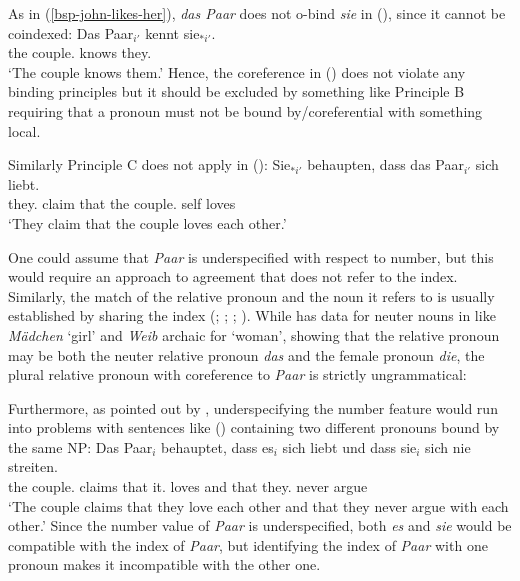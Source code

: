 \documentclass[output=paper
	        ,collection
	        ,collectionchapter
 	        ,biblatex
                ,babelshorthands
                ,newtxmath
                ,draftmode
                ,colorlinks, citecolor=brown
]{langscibook}
\begin{document}
As in (\ref{bsp-john-likes-her}), \emph{das Paar} does not o-bind \emph{sie} in (), since it cannot be coindexed:
\ea
\gll Das Paar$_{i'}$ kennt sie$_{*i'}$.\\
     the couple.\sg{} knows they.\pl\\
\glt `The couple knows them.'
\z
Hence, the coreference in () does not violate any binding principles but it should be excluded
by something like Principle B requiring that a pronoun must not be bound by/coreferential with
something local.

Similarly Principle C does not apply in ():
\ea
\gll Sie$_{*i'}$ behaupten, dass das Paar$_{i'}$ sich liebt.\\
     they.\pl{} claim      that the couple.\sg{} self loves\\
\glt `They claim that the couple loves each other.'
\z

One could assume that \emph{Paar} is underspecified with respect to number, but this would require
an approach to agreement that does not refer to the index.
\eal
{}
\zl
Similarly, the match of the relative pronoun and the noun it refers to is usually established by
sharing the index (\citealp[Chapter~5]{ps2}; \citealp{Sag97a}; \citealp[Chapter~11]{MuellerLehrbuch1};
). While \citet[--418]{Mueller99a} has data for neuter nouns in 
like \emph{Mädchen} `girl' and \emph{Weib} archaic for `woman', showing that the relative pronoun may be both the neuter
relative pronoun \emph{das} and the female pronoun \emph{die}, the plural relative pronoun with
coreference to \emph{Paar} is strictly ungrammatical:%
\eal
{}
\zl

Furthermore, as pointed out by \citet[]{Mueller99a}, underspecifying the number feature would run into problems with sentences like
() containing two different pronouns bound by the same NP:
\ea
\label{ex-paar-es-sie}
\gll Das Paar$_{i}$    behauptet, dass es$_{i}$ sich    liebt und dass sie$_{i}$   sich nie streiten.\\
     the couple.\sg{} claims     that it.\sg{} \self{} loves and that they.\pl{} \self{} never argue\\
\glt `The couple claims that they love each other and that they never argue with each other.'
\z
Since the number value of \emph{Paar} is underspecified, both \emph{es} and \emph{sie} would be
compatible with the index of \emph{Paar}, but identifying the index of \emph{Paar} with one pronoun
makes it incompatible with the other one. 
\end{document}
